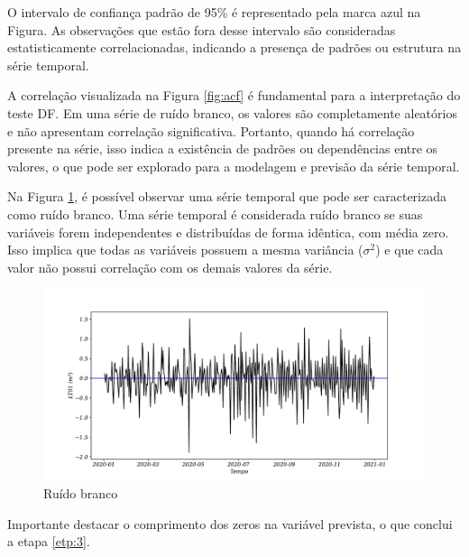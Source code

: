 O intervalo de confiança padrão de 95\% é representado pela marca azul na Figura. As observações que estão fora desse intervalo são consideradas estatisticamente correlacionadas, indicando a presença de padrões ou estrutura na série temporal.

A correlação visualizada na Figura \ref{fig:acf} é fundamental para a interpretação do teste DF. Em uma série de ruído branco, os valores são completamente aleatórios e não apresentam correlação significativa. Portanto, quando há correlação presente na série, isso indica a existência de padrões ou dependências entre os valores, o que pode ser explorado para a modelagem e previsão da série temporal.


Na Figura \ref{fig:ruido-branco}, é possível observar uma série temporal que pode ser caracterizada como ruído branco. Uma série temporal é considerada ruído branco se suas variáveis forem independentes e distribuídas de forma idêntica, com média zero. Isso implica que todas as variáveis possuem a mesma variância ($\sigma^2$) e que cada valor não possui correlação com os demais valores da série.

\begin{figure}[H]
	\centering
	\caption{Ruído branco}
	\label{fig:ruido-branco}
	\includegraphics[width=0.9\linewidth]{Resultados/Figuras/ruido-branco}
	
\end{figure}

Importante destacar o comprimento dos zeros na variável prevista, o que conclui a etapa \ref{etp:3}.